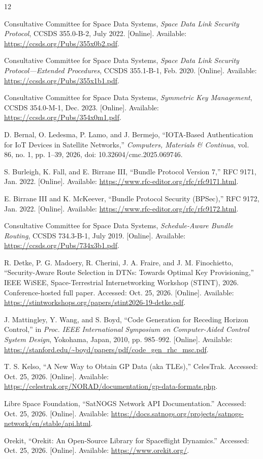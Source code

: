 \documentclass[conference]{IEEEtran}
\begin{document}
\begin{thebibliography}{12}

Consultative Committee for Space Data Systems,
\emph{Space Data Link Security Protocol},
CCSDS 355.0-B-2,
July 2022.
[Online]. Available:
\url{https://ccsds.org/Pubs/355x0b2.pdf}.

Consultative Committee for Space Data Systems,
\emph{Space Data Link Security Protocol---Extended Procedures},
CCSDS 355.1-B-1,
Feb. 2020.
[Online]. Available:
\url{https://ccsds.org/Pubs/355x1b1.pdf}.

Consultative Committee for Space Data Systems,
\emph{Symmetric Key Management},
CCSDS 354.0-M-1,
Dec. 2023.
[Online]. Available:
\url{https://ccsds.org/Pubs/354x0m1.pdf}.

D. Bernal, O. Ledesma, P. Lamo, and J. Bermejo,
``IOTA-Based Authentication for IoT Devices in Satellite Networks,''
\emph{Computers, Materials \& Continua},
vol. 86, no. 1, pp. 1--39, 2026,
doi: 10.32604/cmc.2025.069746.

S. Burleigh, K. Fall, and E. Birrane III,
``Bundle Protocol Version 7,''
RFC 9171,
Jan. 2022.
[Online]. Available:
\url{https://www.rfc-editor.org/rfc/rfc9171.html}.

E. Birrane III and K. McKeever,
``Bundle Protocol Security (BPSec),''
RFC 9172,
Jan. 2022.
[Online]. Available:
\url{https://www.rfc-editor.org/rfc/rfc9172.html}.

Consultative Committee for Space Data Systems,
\emph{Schedule-Aware Bundle Routing},
CCSDS 734.3-B-1,
July 2019.
[Online]. Available:
\url{https://ccsds.org/Pubs/734x3b1.pdf}.

R. Detke, P. G. Madoery, R. Cherini, J. A. Fraire,
and J. M. Finochietto,
``Security-Aware Route Selection in DTNs:
Towards Optimal Key Provisioning,''
IEEE WiSEE,
Space-Terrestrial Internetworking Workshop (STINT), 2026.
Conference-hosted full paper.
Accessed: Oct. 25, 2026.
[Online]. Available:
\url{https://stintworkshops.org/papers/stint2026-19-detke.pdf}.

J. Mattingley, Y. Wang, and S. Boyd,
``Code Generation for Receding Horizon Control,''
in \emph{Proc. IEEE International Symposium on
Computer-Aided Control System Design},
Yokohama, Japan,
2010, pp. 985--992.
[Online]. Available:
\url{https://stanford.edu/~boyd/papers/pdf/code_gen_rhc_msc.pdf}.

T. S. Kelso,
``A New Way to Obtain GP Data (aka TLEs),''
CelesTrak.
Accessed: Oct. 25, 2026.
[Online]. Available:
\url{https://celestrak.org/NORAD/documentation/gp-data-formats.php}.

Libre Space Foundation,
``SatNOGS Network API Documentation.''
Accessed: Oct. 25, 2026.
[Online]. Available:
\url{https://docs.satnogs.org/projects/satnogs-network/en/stable/api.html}.

Orekit,
``Orekit: An Open-Source Library for Spaceflight Dynamics.''
Accessed: Oct. 25, 2026.
[Online]. Available:
\url{https://www.orekit.org/}.

\end{thebibliography}
\end{document}
